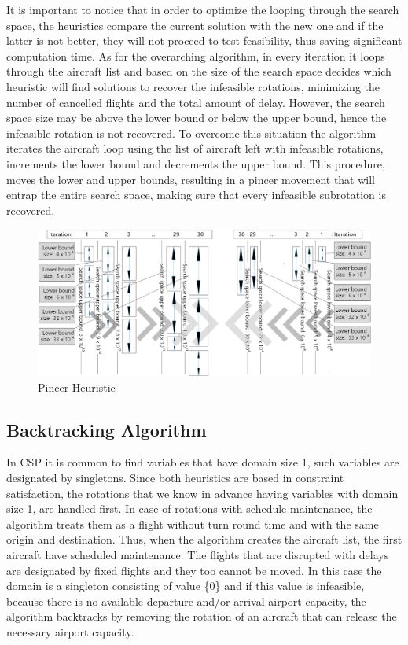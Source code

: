 It is important to notice that in order to optimize the looping through the search space, the heuristics compare the current solution with the new one and if the latter is not better, they will not proceed to test feasibility, thus saving significant computation time. 
As for the overarching algorithm, in every iteration it loops through the aircraft list and based on the size of the search space decides which heuristic will find solutions to recover the infeasible rotations, minimizing the number of cancelled flights and the total amount of delay. However, the search space size may be above the lower bound or below the upper bound, hence the infeasible rotation is not recovered. To overcome this situation the algorithm iterates the aircraft loop using the list of aircraft left with infeasible rotations, increments the lower bound %
and decrements the upper bound. %
  This procedure, moves the lower and upper bounds, resulting in a pincer movement that will entrap the entire search space, making sure that every infeasible subrotation is recovered.\\
 
 \begin{figure}[h!]
 	\centering
 	\includegraphics[scale=0.45]{figures/pincer.png}
 	\caption[]{Pincer Heuristic}
 	\label{fig:pincer}
 \end{figure}
%
%
\subsection{Backtracking Algorithm} \label{sec:backtracking}

In CSP it is common to find variables that have domain size 1, such variables are designated by singletons. Since both heuristics are based in constraint satisfaction, the rotations that we know in advance having variables with domain size 1, are handled first. In case of rotations with schedule maintenance, the algorithm treats them as a flight without turn round time and with the same origin and destination.  Thus, when the algorithm creates the aircraft list, the first aircraft have scheduled maintenance. The flights that are disrupted with delays are designated by fixed flights and they too cannot be moved. In this case the domain is a singleton consisting of value \{0\} and if this value is infeasible, because there is no available departure and/or arrival airport capacity, the algorithm backtracks by removing the rotation of an aircraft that can release the necessary airport capacity.

